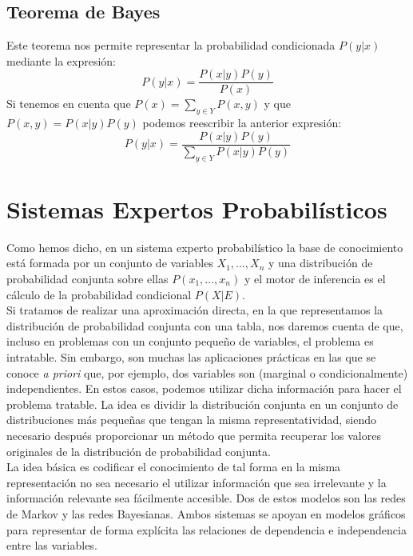 \documentclass{article}
\theoremstyle{definition_wo_parentheses}
\begin{document}
\subsection{Teorema de Bayes}
Este teorema nos permite representar la probabilidad condicionada $P(y|x)$ mediante la expresión:
\[	P(y|x)=\frac{P(x|y)P(y)}{P(x)}	\]
Si tenemos en cuenta que $P(x) = \sum_{y \in Y}P(x,y)$ y que $P(x,y) = P(x|y)P(y)$ podemos reescribir la anterior expresión:
\[	P(y|x) = \frac{P(x|y)P(y)}{\sum_{y \in Y} P(x|y)P(y)}	\]

\section{Sistemas Expertos Probabilísticos}
Como hemos dicho, en un sistema experto probabilístico la base de conocimiento está formada por un conjunto de variables $X_1,...,X_n$ y una distribución de probabilidad conjunta sobre ellas $P(x_1,...,x_n)$ y el motor de inferencia es el cálculo de la probabilidad condicional $P(X|E)$.\\
Si tratamos de realizar una aproximación directa, en la que representamos la distribución de probabilidad conjunta con una tabla, nos daremos cuenta de que, incluso en problemas con un conjunto pequeño de variables, el problema es intratable. Sin embargo, son muchas las aplicaciones prácticas en las que se conoce \textit{a priori} que, por ejemplo, dos variables son (marginal o condicionalmente) independientes. En estos casos, podemos utilizar dicha información para hacer el problema tratable. La idea es dividir la distribución conjunta en un conjunto de distribuciones más pequeñas que tengan la misma representatividad, siendo necesario después proporcionar un método que permita recuperar los valores originales de la distribución de probabilidad conjunta.\\
La idea básica es codificar el conocimiento de tal forma en la misma representación no sea necesario el utilizar información que sea irrelevante y la información relevante sea fácilmente accesible. Dos de estos modelos son las redes de Markov y las redes Bayesianas. Ambos sistemas se apoyan en modelos gráficos para representar de forma explícita las relaciones de dependencia e independencia entre las variables.
\end{document}
